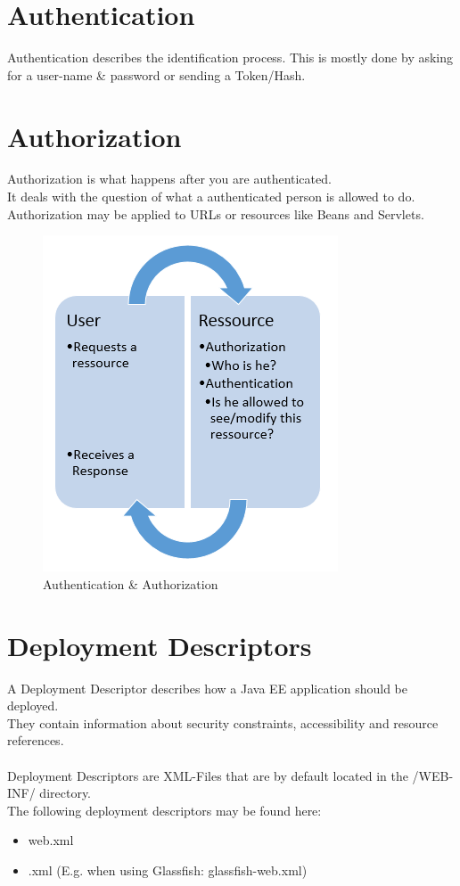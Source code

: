 \documentclass[12pt,a4paper]{report}
\begin{document}
\section{Authentication}
Authentication describes the identification process. This is mostly done by asking for a user-name \& password or sending a Token/Hash.

\section{Authorization}
Authorization is what happens after you are authenticated.\\
It deals with the question of what a authenticated person is allowed to do.\\
Authorization may be applied to URLs or resources like Beans and Servlets.\\

\begin{figure}[h]
	\centering
	\includegraphics[width=0.5\linewidth]{res/AuthenAuthor}
	\caption{Authentication \& Authorization}
	\label{fig:AuthenAuthor}
\end{figure}

\section{Deployment Descriptors}
A Deployment Descriptor describes how a Java EE application should be deployed.\\
They contain information about security constraints, accessibility and resource references.\\\\
Deployment Descriptors are XML-Files that are by default located in the /WEB-INF/ directory.\\
The following deployment descriptors may be found here:
\begin{itemize}
	\item web.xml
	\item <vendor-specific>.xml (E.g. when using Glassfish: glassfish-web.xml)
\end{itemize}
\end{document}
